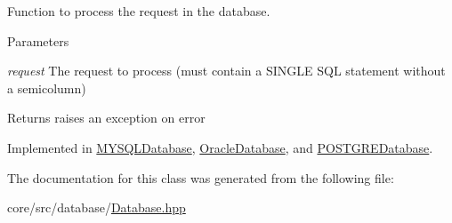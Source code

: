 Function to process the request in the database. 


\begin{DoxyParams}{Parameters}
\item[{\em request}]The request to process (must contain a SINGLE SQL statement without a semicolumn) \end{DoxyParams}
\begin{DoxyReturn}{Returns}
raises an exception on error 
\end{DoxyReturn}


Implemented in \hyperlink{classMYSQLDatabase_ae43c4557f43b775f26817082f4913d81}{MYSQLDatabase}, \hyperlink{classOracleDatabase_ae6515239e0f313896f21b3ec267acdd9}{OracleDatabase}, and \hyperlink{classPOSTGREDatabase_a0371d887a489418bed525acb0d9c5eb3}{POSTGREDatabase}.



The documentation for this class was generated from the following file:\begin{DoxyCompactItemize}
\item 
core/src/database/\hyperlink{Database_8hpp}{Database.hpp}\end{DoxyCompactItemize}
